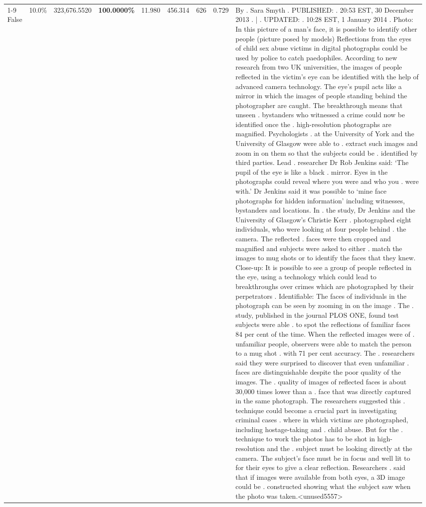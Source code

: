 \begin{table}[H]
\begin{tabular}{lllrlllll}
\cline{1-9}
False & 10.0\% & 323,676.5520 & \bfseries \color{red} 100.0000\% & 11.980 & 456.314 & 626 & 0.729 & By . Sara Smyth . PUBLISHED: . 20:53 EST, 30 December 2013 . | . UPDATED: . 10:28 EST, 1 January 2014 . Photo: In this picture of a man's face, it is possible to identify other people (picture posed by models) Reflections from the eyes of child sex abuse victims in digital photographs could be used by police to catch paedophiles. According to new research from two UK universities, the images of people reflected in the victim's eye can be identified with the help of advanced camera technology. The eye's pupil acts like a mirror in which the images of people standing behind the photographer are caught. The breakthrough means that unseen . bystanders who witnessed a crime could now be identified once the . high-resolution photographs are magnified. Psychologists . at the University of York and the University of Glasgow were able to . extract such images and zoom in on them so that the subjects could be . identified by third parties. Lead . researcher Dr Rob Jenkins said: ‘The pupil of the eye is like a black . mirror. Eyes in the photographs could reveal where you were and who you . were with.' Dr Jenkins said it was possible to ‘mine face photographs for hidden information' including witnesses, bystanders and locations. In . the study, Dr Jenkins and the University of Glasgow's Christie Kerr . photographed eight individuals, who were looking at four people behind . the camera. The reflected . faces were then cropped and magnified and subjects were asked to either . match the images to mug shots or to identify the faces that they knew. Close-up: It is possible to see a group of people reflected in the eye, using a technology which could lead to breakthroughs over crimes which are photographed by their perpetrators . Identifiable: The faces of individuals in the photograph can be seen by zooming in on the image . The . study, published in the journal PLOS ONE, found test subjects were able . to spot the reflections of familiar faces 84 per cent of the time. When the reflected images were of . unfamiliar people, observers were able to match the person to a mug shot . with 71 per cent accuracy. The . researchers said they were surprised to discover that even unfamiliar . faces are distinguishable despite the poor quality of the images. The . quality of images of reflected faces is about 30,000 times lower than a . face that was directly captured in the same photograph. The researchers suggested this . technique could become a crucial part in investigating criminal cases . where in which victims are photographed, including hostage-taking and . child abuse. But for the . technique to work the photos has to be shot in high-resolution and the . subject must be looking directly at the camera. The subject's face must be in focus and well lit to for their eyes to give a clear reflection. Researchers . said that if images were available from both eyes, a 3D image could be . constructed showing what the subject saw when the photo was taken.<unused5557> \\

\end{tabular}
\end{table}
